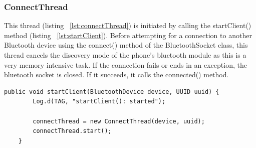 \documentclass[12pt,a4paper]{article}
\begin{document}
    \subsubsection*{ConnectThread}
    This thread (listing ~\ref{lst:connectThread}) is initiated by calling the startClient() method (listing ~\ref{lst:startClient}). Before attempting for a connection to another Bluetooth device using the connect() method of the BluetoothSocket class, this thread cancels the discovery mode of the phone's bluetooth module as this is a very memory intensive task. If the connection fails or ends in an exception, the bluetooth socket is closed. If it succeeds, it calls the connected() method.
    
    \begin{lstlisting}[label={lst:startClient}, caption=startClient() method]
    public void startClient(BluetoothDevice device, UUID uuid) {
        Log.d(TAG, "startClient(): started");

        connectThread = new ConnectThread(device, uuid);
        connectThread.start();
    }
    \end{lstlisting}
    
\end{document}
